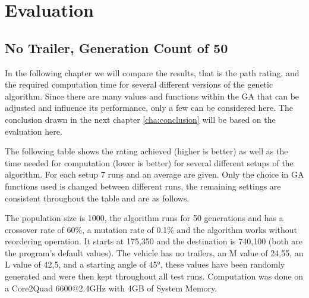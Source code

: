 \chapter{Evaluation}
\label{cha:evaluation}

\section{No Trailer, Generation Count of 50}
\label{sec:no_trailer_50}

In the following chapter we will compare the results, that is the path rating, and the required computation time for several different versions of the genetic algorithm.
Since there are many values and functions within the GA that can be adjusted and influence its performance, only a few can be considered here. The conclusion drawn in the next chapter \ref{cha:conclusion} will be based on the evaluation here.

The following table shows the rating achieved (higher is better) as well as the time needed for computation (lower is better) for several different setups of the algorithm. For each setup 7 runs and an average are given. Only the choice in GA functions used is changed between different runs, the remaining settings are consistent throughout the table and are as follows.

The population size is 1000, the algorithm runs for 50 generations and has a crossover rate of 60\%, a mutation rate of 0.1\% and the algorithm works without reordering operation. It starts at 175,350 and the destination is 740,100 (both are the program's default values). The vehicle has no trailers, an M value of 24,55, an L value of 42,5, and a starting angle of 45°, these values have been randomly generated and were then kept throughout all test runs.
Computation was done on a Core2Quad 6600@2.4GHz with 4GB of System Memory.

